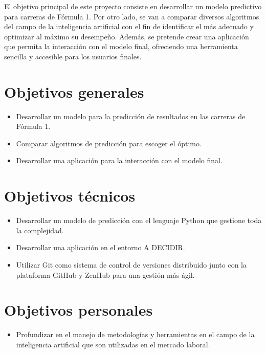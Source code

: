 
El objetivo principal de este proyecto consiste en desarrollar un modelo predictivo para carreras de Fórmula 1. Por otro lado, se van a comparar diversos algoritmos del campo de la inteligencia artificial con el fin de identificar el más adecuado y optimizar al máximo su desempeño. Además, se pretende crear una aplicación que permita la interacción con el modelo final, ofreciendo una herramienta sencilla y accesible para los usuarios finales.

\section{Objetivos generales}\label{objetivos-generales}

\begin{itemize}
\tightlist
\item
  Desarrollar un modelo para la predicción de resultados en las carreras de Fórmula 1.
\item
  Comparar algoritmos de predicción para escoger el óptimo.
\item
  Desarrollar una aplicación para  la interacción con el modelo final.
\end{itemize}

\section{Objetivos técnicos}\label{objetivos-tecnicos}

\begin{itemize}
\tightlist
\item
  Desarrollar un modelo de predicción con el lenguaje Python que gestione toda la complejidad.
\item
  Desarrollar una aplicación en el entorno A DECIDIR.
\item
  Utilizar Git como sistema de control de versiones distribuido junto con
la plataforma GitHub y ZenHub para una gestión más ágil.
\end{itemize}

\section{Objetivos personales}\label{objetivos-personales}

\begin{itemize}
\tightlist
\item
  Profundizar en el manejo de metodologías y herramientas en el campo de la inteligencia artificial que son utilizadas en el mercado laboral.
\end{itemize}

